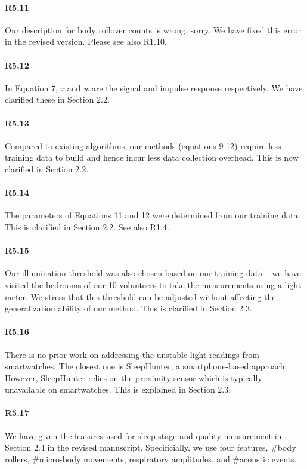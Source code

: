 \paragraph{R5.11} Our description for body rollover counts is wrong, sorry. We have fixed this error in the revised version. Please see
also R1.10.


\paragraph{R5.12} In Equation 7, \emph{x} and \emph{w} are the signal and impulse response respectively. We have clarified these in
Section 2.2.

\paragraph{R5.13} Compared to existing algorithms, our methods (equations 9-12) require less training data to build and hence incur less
data collection overhead. This is now clarified in Section 2.2.

\paragraph{R5.14} The parameters of Equations 11 and 12 were determined from our training data. This is clarified in Section 2.2. See also R1.4.

\paragraph{R5.15} Our illumination threshold was also chosen based on our training data -- we have visited the bedrooms of our 10 volunteers
to take the measurements using a light meter. We stress that this threshold can be adjusted without affecting the generalization ability of
our method. This is clarified in Section 2.3.

\paragraph{R5.16} There is no prior work on addressing the unstable light readings from smartwatches. The closest one is SleepHunter, a
smartphone-based approach. However, SleepHunter relies on the proximity sensor which is typically unavailable on smartwatches. This is
explained in Section 2.3.

\paragraph{R5.17} We have given the features used for sleep stage and quality measurement in Section 2.4 in the revised manuscript.
Specificially, we use four features, \#body rollers, \#micro-body movements, respiratory amplitudes, and \#acoustic events.

